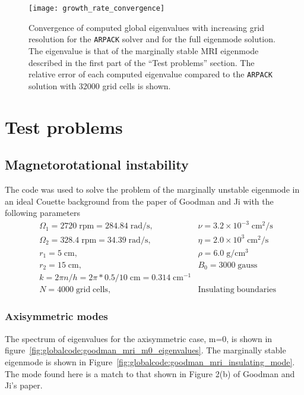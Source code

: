 \documentclass[letterpaper]{article}
\begin{document}
\begin{figure}
\centering
\texttt{[image: growth\_rate\_convergence]}
\caption[Convergence of computed global eigenvalues with increasing
  grid resolution]{Convergence of computed global eigenvalues with
  increasing grid resolution for the \texttt{ARPACK} solver and for the
  full eigenmode solution. The eigenvalue is that of the marginally
  stable MRI eigenmode described in the first part of the ``Test
  problems'' section. The relative error of each computed eigenvalue
  compared to the \texttt{ARPACK} solution with 32000 grid cells is
  shown.}
\label{fig:globalcode:growth_rate_convergence}
\end{figure}

\section{Test problems}

\subsection{Magnetorotational instability}

The code was used to solve the problem of the marginally unstable
eigenmode in an ideal Couette background from the paper of Goodman and
Ji with the following parameters
\begin{align*}
&\Omega_1 = 2720\;\mathrm{rpm} = 284.84\;\mathrm{rad/s},\quad
    &\nu = 3.2\times10^{-3}\;\mathrm{cm^2/s}
\\
&\Omega_2 = 328.4\;\mathrm{rpm} = 34.39\;\mathrm{rad/s},\quad
    &\eta = 2.0\times10^{3}\;\mathrm{cm^2/s}
\\
&r_1 = 5\;\mathrm{cm},\quad &\rho = 6.0\;\mathrm{g/cm^3}
\\
&r_2 = 15\;\mathrm{cm},\quad &B_0 = 3000\; \mathrm{gauss}
\\
&k = 2\pi n/h = 2\pi*0.5/10\;\mathrm{cm} = 0.314\;\mathrm{cm^{-1}}
\\
&N = 4000\;\mathrm{grid\;cells},\quad &\mathrm{Insulating\;boundaries}
\end{align*}

\subsubsection{Axisymmetric modes}

The spectrum of eigenvalues for the axisymmetric case, m=0, is shown
in figure~\ref{fig:globalcode:goodman_mri_m0_eigenvalues}. The
marginally stable eigenmode is shown in
Figure~\ref{fig:globalcode:goodman_mri_insulating_mode}. The mode
found here is a match to that shown in Figure 2(b)
of Goodman and Ji's paper.
\end{document}
